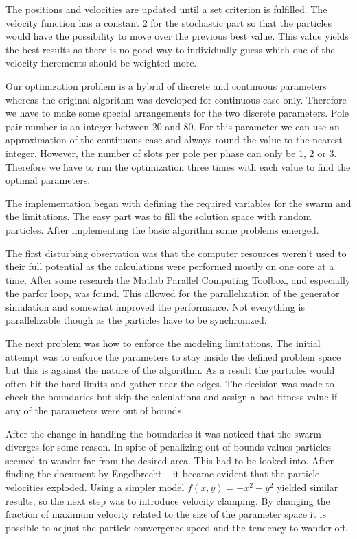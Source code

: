 \documentclass[twoside]{article}
\begin{document}
\begin{multicols}{2}
The positions and velocities are updated until a set criterion is fulfilled. The velocity function has a constant 2 for the stochastic part so that the particles would have the possibility to move over the previous best value. This value yields the best results as there is no good way to individually guess which one of the velocity increments should be weighted more. \cite{pso} 

Our optimization problem is a hybrid of discrete and continuous parameters whereas the original algorithm was developed for continuous case only. Therefore we have to make some special arrangements for the two discrete parameters. Pole pair number is an integer between 20 and 80. For this parameter we can use an approximation of the continuous case and always round the value to the nearest integer. However, the number of slots per pole per phase can only be 1, 2 or 3. Therefore we have to run the optimization three times with each value to find the optimal parameters.

The implementation began with defining the required variables for the swarm and the limitations. The easy part was to fill the solution space with random particles. After implementing the basic algorithm some problems emerged.

The first disturbing observation was that the computer resources weren't used to their full potential as the calculations were performed mostly on one core at a time. After some research the Matlab Parallel Computing Toolbox, and especially the parfor loop, was found. This allowed for the parallelization of the generator simulation and somewhat improved the performance. Not everything is parallelizable though as the particles have to be synchronized. 

The next problem was how to enforce the modeling limitations. The initial attempt was to enforce the parameters to stay inside the defined problem space but this is against the nature of the algorithm. As a result the particles would often hit the hard limits and gather near the edges. The decision was made to check the boundaries but skip the calculations and assign a bad fitness value if any of the parameters were out of bounds.

After the change in handling the boundaries it was noticed that the swarm diverges for some reason. In spite of penalizing out of bounds values particles seemed to wander far from the desired area. This had to be looked into. After finding the document by Engelbrecht ~\cite{pitfalls} it became evident that the particle velocities exploded. Using a simpler model $f(x,y)=-x^2-y^2$ yielded similar results, so the next step was to introduce velocity clamping. By changing the fraction of maximum velocity related to the size of the parameter space it is possible to adjust the particle convergence speed and the tendency to wander off.



\end{multicols}
\end{document}

